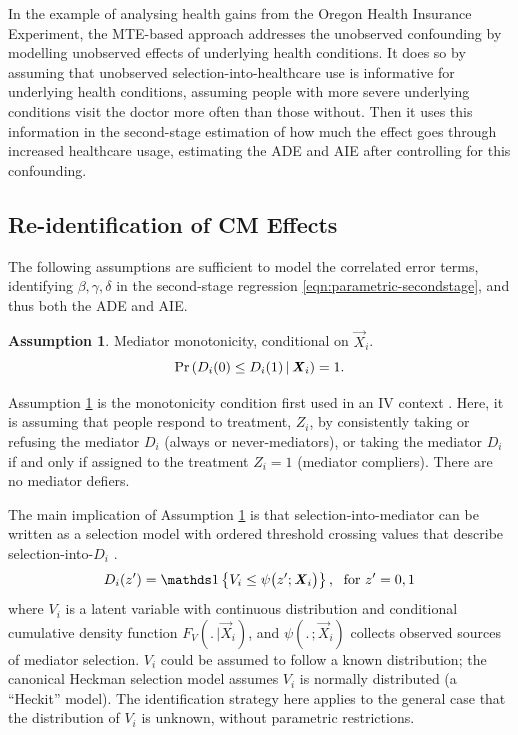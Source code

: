 In the example of analysing health gains from the Oregon Health Insurance Experiment, the MTE-based approach addresses the unobserved confounding by modelling unobserved effects of underlying health conditions.
It does so by assuming that unobserved selection-into-healthcare use is informative for underlying health conditions, assuming people with more severe underlying conditions visit the doctor more often than those without.
Then it uses this information in the second-stage estimation of how much the effect goes through increased healthcare usage, estimating the ADE and AIE after controlling for this confounding.

\subsection{Re-identification of CM Effects}
The following assumptions are sufficient to model the correlated error terms, identifying $\beta, \gamma, \delta$ in the second-stage regression \eqref{eqn:parametric-secondstage}, and thus both the ADE and AIE.

\theoremstyle{definition}
\newtheorem{assumptionMTE}{Assumption}
\renewcommand\theassumptionMTE{MTE--\arabic{assumptionMTE}}
\begin{assumptionMTE}
    \label{mte:monotonicity}
    Mediator monotonicity, conditional on $\vec X_i$.
    \[ \Pr\left(  D_i(0) \leq D_i(1)  \, \middle\vert \, \boldsymbol{\mathit{X}}_i \right) = 1. \]
\end{assumptionMTE}
\noindent
Assumption \ref{mte:monotonicity} is the monotonicity condition first used in an IV context \citep{imbens1994identification}.
Here, it is assuming that people respond to treatment, $Z_i$, by consistently taking or refusing the mediator $D_i$ (always or never-mediators), or taking the mediator $D_i$ if and only if assigned to the treatment $Z_i=1$ (mediator compliers).
There are no mediator defiers.

The main implication of Assumption \ref{mte:monotonicity} is that selection-into-mediator can be written as a selection model with ordered threshold crossing values that describe selection-into-$D_i$ \citep{vytlacil2002independence}.
\[ D_i(z') = \indicator{V_i \leq \psi \big( z'; \vec X_i \big)},
    \;\text{ for } z'=0,1 \]
where $V_i$ is a latent variable with continuous distribution and conditional cumulative density function $F_V(. \,|\vec X_i)$, and $\psi(. \,;\vec X_i)$ collects observed sources of mediator selection.
$V_i$ could be assumed to follow a known distribution; the canonical Heckman selection model assumes $V_i$ is normally distributed (a ``Heckit'' model).
The identification strategy here applies to the general case that the distribution of $V_i$ is unknown, without parametric restrictions.

